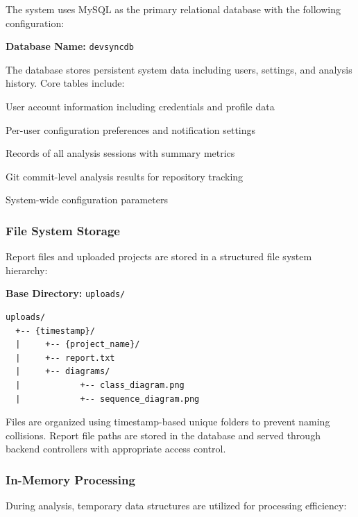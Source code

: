 \documentclass[12pt,a4paper]{article}
\begin{document}
    The system uses MySQL as the primary relational database with the following configuration:

    \textbf{Database Name:} \texttt{devsyncdb}

    The database stores persistent system data including users, settings, and analysis history. Core tables include:

    \begin{description}[font=\bfseries, leftmargin=0.5in]
        \item[users] User account information including credentials and profile data
        \item[user\_settings] Per-user configuration preferences and notification settings
        \item[analysis\_history] Records of all analysis sessions with summary metrics
        \item[commit\_analysis] Git commit-level analysis results for repository tracking
        \item[admin\_settings] System-wide configuration parameters
    \end{description}

    \subsubsection{File System Storage}

    Report files and uploaded projects are stored in a structured file system hierarchy:

    \textbf{Base Directory:} \texttt{uploads/}

    \begin{Verbatim}[frame=single, fontsize=\small]
uploads/
  +-- {timestamp}/
  |     +-- {project_name}/
  |     +-- report.txt
  |     +-- diagrams/
  |            +-- class_diagram.png
  |            +-- sequence_diagram.png
    \end{Verbatim}

    Files are organized using timestamp-based unique folders to prevent naming collisions. Report file paths are stored in the database and served through backend controllers with appropriate access control.

    \subsubsection{In-Memory Processing}

    During analysis, temporary data structures are utilized for processing efficiency:
\end{document}
